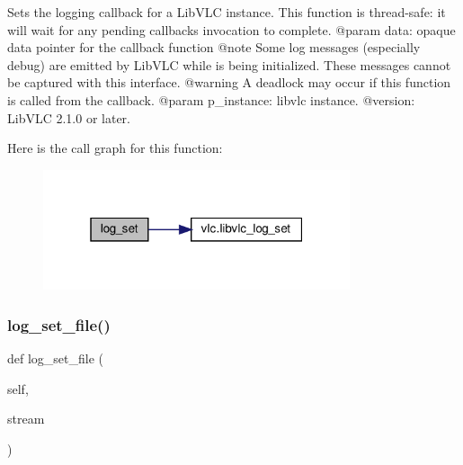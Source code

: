 \begin{DoxyVerb}Sets the logging callback for a LibVLC instance.
This function is thread-safe: it will wait for any pending callbacks
invocation to complete.
@param data: opaque data pointer for the callback function @note Some log messages (especially debug) are emitted by LibVLC while is being initialized. These messages cannot be captured with this interface. @warning A deadlock may occur if this function is called from the callback.
@param p_instance: libvlc instance.
@version: LibVLC 2.1.0 or later.
\end{DoxyVerb}
 Here is the call graph for this function\+:
\nopagebreak
\begin{figure}[H]
\begin{center}
\leavevmode
\includegraphics[width=256pt]{classvlc_1_1_instance_ab18316368daf58ca970aa6369e9641eb_cgraph}
\end{center}
\end{figure}
\mbox{\label{classvlc_1_1_instance_a44432718b2b47222fcf097605de1bfad}} 
\subsubsection{\texorpdfstring{log\+\_\+set\+\_\+file()}{log\_set\_file()}}
{\footnotesize\ttfamily def log\+\_\+set\+\_\+file (\begin{DoxyParamCaption}\item[{}]{self,  }\item[{}]{stream }\end{DoxyParamCaption})}

